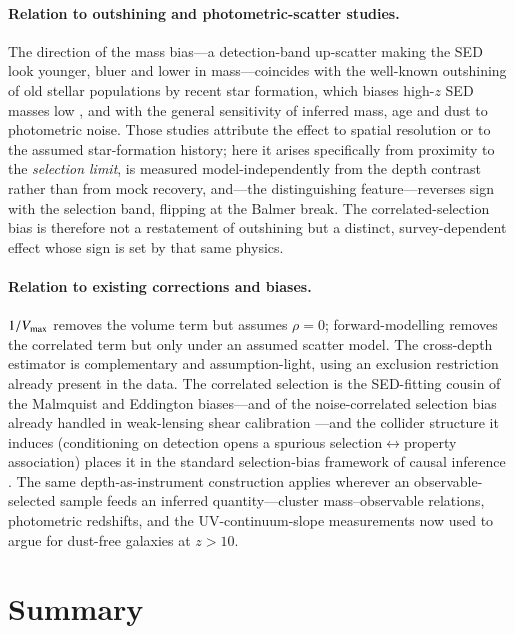 \documentclass{aa}
\begin{document}
\paragraph{Relation to outshining and photometric-scatter studies.} The direction of the mass
bias---a detection-band up-scatter making the SED look younger, bluer and lower in mass---coincides
with the well-known outshining of old stellar populations by recent star formation, which biases
high-$z$ SED masses low \citep{Narayanan2023,GimenezArteaga2023,SorbaSawicki2018}, and with the
general sensitivity of inferred mass, age and dust to photometric noise. Those studies attribute the
effect to spatial resolution or to the assumed star-formation history; here it arises specifically
from proximity to the \emph{selection limit}, is measured model-independently from the depth
contrast rather than from mock recovery, and---the distinguishing feature---reverses sign with the
selection band, flipping at the Balmer break. The correlated-selection bias is therefore not a
restatement of outshining but a distinct, survey-dependent effect whose sign is set by that same
physics.

\paragraph{Relation to existing corrections and biases.} $1/V_{\rm max}$ \citep{PageCarrera2000}
removes the volume term but assumes $\rho=0$; forward-modelling removes the correlated term but only
under an assumed scatter model. The cross-depth estimator is complementary and assumption-light, using an exclusion
restriction already present in the data. The correlated selection is the SED-fitting cousin of the
Malmquist and Eddington \citep{Eddington1913} biases---and of the noise-correlated selection bias
already handled in weak-lensing shear calibration \citep{SheldonHuff2017}---and the collider
structure it induces
(conditioning on detection opens a spurious selection$\leftrightarrow$property association) places
it in the standard selection-bias framework of causal inference \citep{Hernan2004}. The same
depth-as-instrument construction applies wherever an observable-selected sample feeds an inferred
quantity---cluster mass--observable relations, photometric redshifts, and the UV-continuum-slope
measurements now used to argue for dust-free galaxies at $z>10$.

\section{Summary}
\label{sec:summary}
\end{document}
